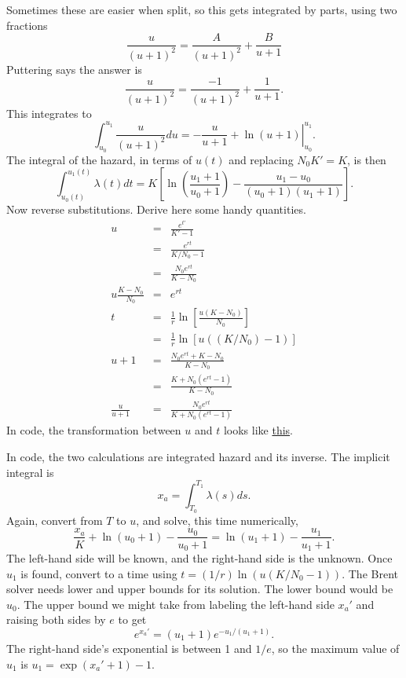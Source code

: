 \documentclass{article}
\begin{document}
Sometimes these are easier when split, so
this gets integrated by parts, using two fractions
\begin{equation}
 \frac{u}{(u+1)^2}=\frac{A}{(u+1)^2} + \frac{B}{u+1}
\end{equation}
Puttering says the answer is
\begin{equation}
 \frac{u}{(u+1)^2}=\frac{-1}{(u+1)^2} + \frac{1}{u+1}.
\end{equation}
This integrates to
\begin{equation}
  \int_{u_0}^{u_1}\frac{u}{(u+1)^2}du=\left.-\frac{u}{u+1} + \ln(u+1)\right|_{u_0}^{u_1}.
\end{equation}
The integral of the hazard, in terms of $u(t)$ and replacing $N_0K'=K$, is then
\begin{equation}
  \int_{u_0(t)}^{u_1(t)}\lambda(t)dt=K\left[
    \ln\left(\frac{u_1+1}{u_0+1}\right)-\frac{u_1-u_0}{(u_0+1)(u_1+1)}
    \right].
\end{equation}
Now reverse substitutions. Derive here some handy quantities.
\begin{eqnarray}
  u & = & \frac{e^{t'}}{K'-1} \\
    & = & \frac{e^{rt}}{K/N_0 - 1} \\
    & = & \frac{N_0e^{rt}}{K-N_0} \\
  u\frac{K-N_0}{N_0} & = & e^{rt} \\
  t & = & \frac{1}{r}\ln\left[\frac{u(K-N_0)}{N_0}\right] \\
    & = & \frac{1}{r}\ln\left[u((K/N_0)-1)\right] \\
  u + 1 & = & \frac{N_0e^{rt}+K-N_0}{K-N_0} \\
        & = & \frac{K + N_0(e^{rt}-1)}{K-N_0} \\
  \frac{u}{u+1} & = & \frac{N_0e^{rt}}{K + N_0(e^{rt}-1)}
\end{eqnarray}
In code, the transformation between $u$ and $t$
looks like \href{https://github.com/adolgert/hop-skip-bite/blob/0ea11efae867e209c90aeab8c087c749ec52a2f7/hopskip/src/excess_growth.hpp#L141-L142}{this}.



In code, the two calculations are integrated hazard and
its inverse.
The implicit integral is
\begin{equation}
  x_a=\int_{T_0}^{T_1}\lambda(s)ds.
\end{equation}
Again, convert from $T$ to $u$, and solve, this time numerically,
\begin{equation}
  \frac{x_a}{K}+\ln(u_0+1)-\frac{u_0}{u_0+1}=\ln(u_1+1)-\frac{u_1}{u_1+1}.
\end{equation}
The left-hand side will be known, and the right-hand side is the unknown.
Once $u_1$ is found, convert to a time using $t=(1/r)\ln(u(K/N_0-1))$.
The Brent solver needs lower and upper bounds for its solution. The lower
bound would be $u_0$. The upper bound we might take from
labeling the left-hand side $x_a'$ and raising both sides
by $e$ to get
\begin{equation}
 e^{x_a'}=(u_1+1)e^{-u_1/(u_1+1)}.
\end{equation}
The right-hand side's exponential is between 1 and $1/e$, so the maximum
value of $u_1$ is $u_1=\exp(x_a' + 1)-1$.
\end{document}
